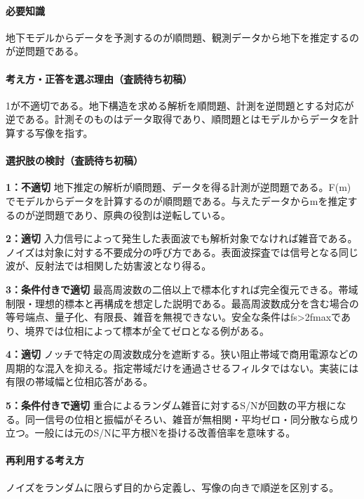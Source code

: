 \paragraph{必要知識} 地下モデルからデータを予測するのが順問題、観測データから地下を推定するのが逆問題である。

\paragraph{考え方・正答を選ぶ理由（査読待ち初稿）} 1が不適切である。地下構造を求める解析を順問題、計測を逆問題とする対応が逆である。計測そのものはデータ取得であり、順問題とはモデルからデータを計算する写像を指す。

\paragraph{選択肢の検討（査読待ち初稿）}\mbox{}\par

\noindent\textbf{1：不適切} 地下推定の解析が順問題、データを得る計測が逆問題である。F(m)でモデルからデータを計算するのが順問題である。与えたデータからmを推定するのが逆問題であり、原典の役割は逆転している。\par

\noindent\textbf{2：適切} 入力信号によって発生した表面波でも解析対象でなければ雑音である。ノイズは対象に対する不要成分の呼び方である。表面波探査では信号となる同じ波が、反射法では相関した妨害波となり得る。\par

\noindent\textbf{3：条件付きで適切} 最高周波数の二倍以上で標本化すれば完全復元できる。帯域制限・理想的標本と再構成を想定した説明である。最高周波数成分を含む場合の等号端点、量子化、有限長、雑音を無視できない。安全な条件はfs>2fmaxであり、境界では位相によって標本が全てゼロとなる例がある。\par

\noindent\textbf{4：適切} ノッチで特定の周波数成分を遮断する。狭い阻止帯域で商用電源などの周期的な混入を抑える。指定帯域だけを通過させるフィルタではない。実装には有限の帯域幅と位相応答がある。\par

\noindent\textbf{5：条件付きで適切} 重合によるランダム雑音に対するS/Nが回数の平方根になる。同一信号の位相と振幅がそろい、雑音が無相関・平均ゼロ・同分散なら成り立つ。一般には元のS/Nに平方根Nを掛ける改善倍率を意味する。\par

\paragraph{再利用する考え方} ノイズをランダムに限らず目的から定義し、写像の向きで順逆を区別する。


